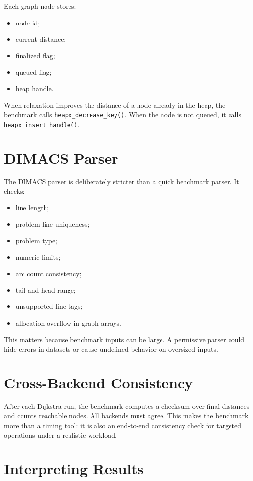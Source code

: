 Each graph node stores:

\begin{itemize}
    \item node id;
    \item current distance;
    \item finalized flag;
    \item queued flag;
    \item heap handle.
\end{itemize}

When relaxation improves the distance of a node already in the heap, the benchmark calls \texttt{heapx\_decrease\_key()}.
When the node is not queued, it calls \texttt{heapx\_insert\_handle()}.

\section{DIMACS Parser}

The DIMACS parser is deliberately stricter than a quick benchmark parser.
It checks:

\begin{itemize}
    \item line length;
    \item problem-line uniqueness;
    \item problem type;
    \item numeric limits;
    \item arc count consistency;
    \item tail and head range;
    \item unsupported line tags;
    \item allocation overflow in graph arrays.
\end{itemize}

This matters because benchmark inputs can be large.
A permissive parser could hide errors in datasets or cause undefined behavior on oversized inputs.

\section{Cross-Backend Consistency}

After each Dijkstra run, the benchmark computes a checksum over final distances and counts reachable nodes.
All backends must agree.
This makes the benchmark more than a timing tool: it is also an end-to-end consistency check for targeted operations under a realistic workload.

\section{Interpreting Results}


